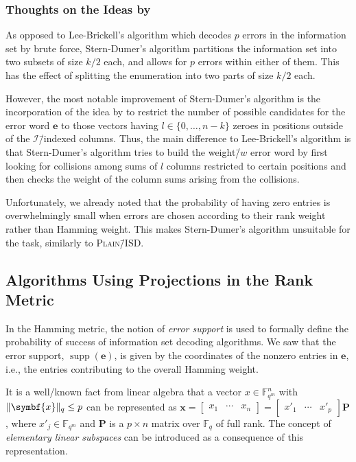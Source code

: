 \documentclass[version=last, paper=A4, parskip=half, oneside]{scrbook}
\theoremstyle{plain}
\theoremstyle{definition}
\theoremstyle{remark}
\renewcommand*{\vec}{\symbf}
\newcommand*{\mat}{\symbf}
\DeclareMathOperator{\supp}{supp}
\newcommand*{\FF}{\ensuremath{\mathbb{F}}}
\DeclarePairedDelimiter{\norm}{\lVert}{\rVert}
\newcommand*{\normR}[2]{\ensuremath{\norm{#1}_{#2}}}
\newcommand*{\PISD}{\textsc{Plain}\=/ISD}
\begin{document}
\subsubsection{Thoughts on the Ideas by \texorpdfstring{\textcite{Ste89,
      Dum96}}{Stern and Dumer}}

As opposed to Lee\--Brickell's algorithm which decodes \(p\) errors in the
information set by brute force, Stern\--Dumer's algorithm partitions the
information set into two subsets of size \(k / {2}\) each, and allows for \(p\)
errors within either of them.  This has the effect of splitting the enumeration
into two parts of size \(k / {2}\) each.

However, the most notable improvement of Stern\--Dumer's algorithm is the
incorporation of the idea by \textcite{Leo88} to restrict the number of
possible candidates for the error word \(\vec{e}\) to those vectors having
\(l \in \{0, \ldots, n - k\}\) zeroes in positions outside of the
\(\mathcal{I}\)\=/indexed columns.  Thus, the main difference to
Lee\--Brickell's algorithm is that Stern\--Dumer's algorithm tries to build the
weight\=/\(w\) error word by first looking for collisions among sums of \(l\)
columns restricted to certain positions and then checks the weight of the
column sums arising from the collisions.

Unfortunately, we already noted that the probability of having zero entries is
overwhelmingly small when errors are chosen according to their rank weight
rather than Hamming weight.  This makes Stern\--Dumer's algorithm unsuitable
for the task, similarly to \PISD\@.

\subsection{Algorithms Using Projections in the Rank Metric}\label{sec:ISD-R-P}

In the Hamming metric, the notion of \emph{error support} is used to formally
define the probability of success of information set decoding algorithms.  We
saw that the error support, \(\supp(\vec{e})\), is given by the coordinates of
the nonzero entries in \(\vec{e}\), i.e., the entries contributing to the
overall Hamming weight.

It is a well\-/known fact from linear algebra that a vector
\(x \in \FF_{q^m}^n\) with \(\normR{\vec{x}}{q} \le p\) can be represented as
\(\vec{x} =
\begin{bmatrix} x_1 & \cdots & x_n \end{bmatrix} =
\begin{bmatrix} x'_1 & \cdots & x'_p \end{bmatrix} \mat{P}\), where
\(x'_j \in \FF_{q^m}\) and \(\mat{P}\) is a \(p \times n\) matrix over
\(\FF_q\) of full rank.  The concept of \emph{elementary linear subspaces} can
be introduced as a consequence of this representation.
\end{document}
